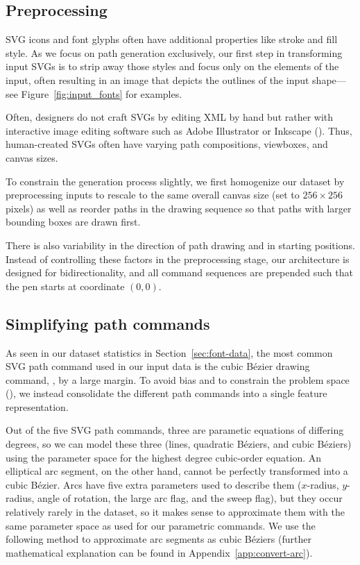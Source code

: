 \subsection{Preprocessing}
SVG icons and font glyphs often have additional properties like stroke and fill style.
As we focus on path generation exclusively, our first step in transforming input SVGs is to strip away those styles and focus only on the  elements of the input, often resulting in an image that depicts the outlines of the input shape---see Figure~\ref{fig:input_fonts} for examples.

Often, designers do not craft SVGs by editing XML by hand but rather with interactive image editing software such as Adobe Illustrator or Inkscape ().
Thus, human-created SVGs often have varying path compositions, viewboxes, and canvas sizes.

To constrain the generation process slightly, we first homogenize our dataset by preprocessing inputs to rescale to the same overall canvas size (set to $256\times 256$ pixels) as well as reorder paths in the drawing sequence so that paths with larger bounding boxes are drawn first.

There is also variability in the direction of path drawing and in starting positions. Instead of controlling these factors in the preprocessing stage, our architecture is designed for bidirectionality, and all command sequences are prepended such that the pen starts at coordinate $(0, 0)$.

\subsection{Simplifying path commands}
As seen in our dataset statistics in Section~\ref{sec:font-data}, the most common SVG path command used in our input data is the cubic B\'ezier drawing command, , by a large margin.
To avoid bias and to constrain the problem space (), we instead consolidate the different path commands into a single feature representation.

Out of the five SVG path commands, three are parametic equations of differing degrees, so we can model these three (lines, quadratic B\'eziers, and cubic B\'eziers) using the parameter space for the highest degree cubic-order equation.
An elliptical arc segment, on the other hand, cannot be perfectly transformed into a cubic B\'ezier. Arcs have five extra parameters used to describe them ($x$-radius, $y$-radius, angle of rotation, the large arc flag, and the sweep flag), but they occur relatively rarely in the dataset, so it makes sense to approximate them with the same parameter space as used for our parametric commands.
We use the following method to approximate arc segments as cubic B\'eziers (further mathematical explanation can be found in Appendix~\ref{app:convert-arc}).

